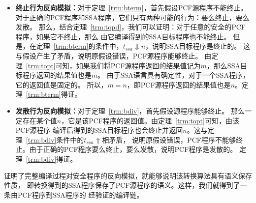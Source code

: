 \begin{itemize}
  \item \textbf{终止行为反向模拟：}对于定理~\ref{trm:bterm}，首先假设PCF源程序不能终止。
    对于正确的PCF程序和SSA程序，它们只有两种可能的行为：要么终止，要么发散。
    那么，结合定理~\ref{trm:topd}，我们可以证明：对于任意的安全的PCF程序，如果它不终止，那么
    由它编译得到的SSA目标程序也不能终止。
    但是，在定理~\ref{trm:bterm}的条件中，$t_{ssa}\Downarrow n$，说明SSA目标程序是终止的。
    这与假设产生了矛盾，说明原假设错误，PCF源程序能够终止。
    由定理~\ref{trm:topt}可知，如果我们将PCF源程序返回的结果值记为$m$，那么SSA目标程序返回的结果值也是$m$。
    由于SSA语言具有确定性，对于一个SSA程序，它的返回值是固定的。
    所以，$m=n$，即PCF源程序返回的结果值也是$n$。定理~\ref{trm:bterm}得证。
  \item \textbf{发散行为反向模拟：}对于定理~\ref{trm:bdiv}，首先假设源程序能够终止。
    那么一定存在某个值$n$，它是该PCF程序的返回值。由定理~\ref{trm:topt}可知，由该PCF源程序
    编译后得到的SSA目标程序也会终止并返回$n$。这与定理~\ref{trm:bdiv}条件中的$t_{ssa}\Uparrow$相矛盾，
    说明原假设错误，PCF程序不能够终止。由于正确的PCF程序要么终止，要么发散，说明PCF程序是发散的。
    定理~\ref{trm:bdiv}得证。
\end{itemize}

证明了完整编译过程对安全程序的反向模拟，就能够说明该转换算法具有语义保存性质，
即转换得到的SSA程序保存了PCF源程序的语义。这样，我们就得到了一条由PCF程序到SSA程序的
经验证的编译链。

